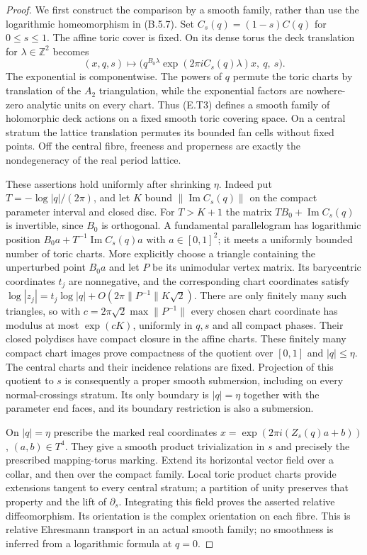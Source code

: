 \begin{proof}
We first construct the comparison by a smooth family, rather
than use the logarithmic homeomorphism in (B.5.7).  Set
$C_s(q)=(1-s)C(q)$ for $0\leq s\leq1$.  The affine toric cover
is fixed.  On its dense torus the deck translation for
$\lambda\in\mathbb Z^2$ becomes
\[
 (x,q,s)\longmapsto
 \bigl(q^{B_0\lambda}
       \exp(2\pi i C_s(q)\lambda)x,\ q,\ s\bigr).
 \tag{E.T3}
\]
The exponential is componentwise.  The powers of $q$ permute
the toric charts by translation of the $A_2$ triangulation,
while the exponential factors are nowhere-zero analytic units
on every chart.  Thus (E.T3) defines a smooth family of
holomorphic deck actions on a fixed smooth toric covering
space.  On a central stratum the lattice translation permutes
its bounded fan cells without fixed points.  Off the central
fibre, freeness and properness are exactly the nondegeneracy
of the real period lattice.

These assertions hold uniformly after shrinking $\eta$.
Indeed put $T=-\log|q|/(2\pi)$, and let $K$ bound
$\|\operatorname{Im}C_s(q)\|$ on the compact parameter interval
and closed disc.  For $T>K+1$ the matrix
$TB_0+\operatorname{Im}C_s(q)$ is invertible, since $B_0$ is
orthogonal.  A fundamental parallelogram has logarithmic
position
$B_0a+T^{-1}\operatorname{Im}C_s(q)a$ with
$a\in[0,1]^2$; it meets a uniformly bounded number of toric
charts.  More explicitly choose a triangle containing the
unperturbed point $B_0a$ and let $P$ be its unimodular vertex
matrix.  Its barycentric coordinates $t_j$ are nonnegative,
and the corresponding chart coordinates satisfy
$\log|z_j|=t_j\log|q|+
O(2\pi\|P^{-1}\|K\sqrt2)$.
There are only finitely many such triangles, so with
$c=2\pi\sqrt2\max\|P^{-1}\|$ every chosen chart coordinate
has modulus at most $\exp(cK)$, uniformly in $q,s$ and
all compact phases.  Their closed polydiscs have compact
closure in the affine charts.  These finitely many compact
chart images prove
compactness of the quotient over $[0,1]$ and $|q|\leq\eta$.
The central charts and their incidence relations are fixed.
Projection of this quotient to $s$ is consequently a proper
smooth submersion, including on every normal-crossings stratum.
Its only boundary is $|q|=\eta$ together with the parameter
end faces, and its boundary restriction is also a submersion.

On $|q|=\eta$ prescribe the marked real coordinates
$x=\exp(2\pi i(Z_s(q)a+b))$, $(a,b)\in T^4$.
They give a smooth product trivialization in $s$ and precisely
the prescribed mapping-torus marking.  Extend its horizontal
vector field over a collar, and then over the compact family.
Local toric product charts provide extensions tangent to
every central stratum; a partition of unity preserves that
property and the lift of $\partial_s$.  Integrating this
field proves the asserted relative diffeomorphism.  Its
orientation is the complex orientation on each fibre.
This is relative Ehresmann transport in an actual smooth
family; no smoothness is inferred from a logarithmic formula
at $q=0$.


\end{proof}
